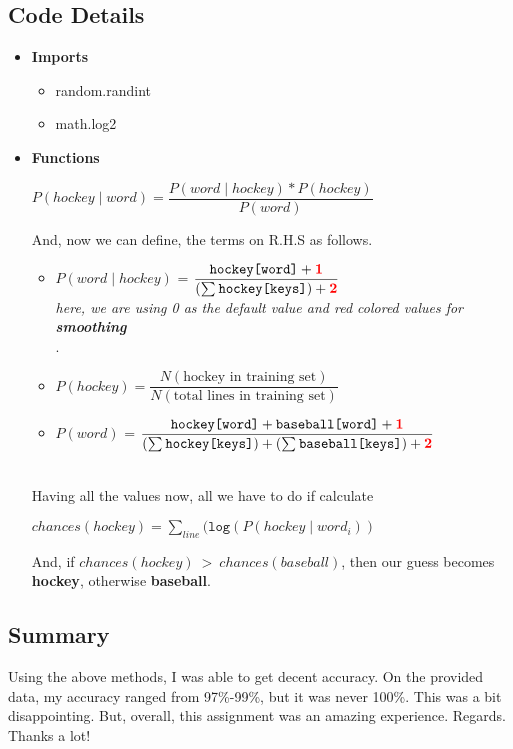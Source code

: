 \documentclass{article}
\begin{document}
    \pagebreak
    \subsection*{Code Details}
    
    \begin{itemize}
        \item \textbf{Imports}
            \begin{itemize}
                \item random.randint
                \item math.log2
            \end{itemize}
        \item \textbf{Functions}
        \begin{center}
                \begin{center}
                    \(P(hockey \mid word) = \dfrac{P(word \mid hockey)*P(hockey)}{P(word)}\)
                \end{center}
                And, now we can define, the terms on R.H.S as follows.
                \vspace{+5mm}
                \begin{itemize}
                    \item \(P(word\mid hockey)\) = \(\dfrac{\texttt{hockey[word]}+\textcolor{red}{\textbf{1}}}{(\sum_{}^{}\texttt{hockey[keys]})+\textcolor{red}{\textbf{2}}}\) \\[2mm]
                    {\scriptsize \emph{     here, we are using 0 as the default value and red colored values for \textbf{smoothing} \\}.}
                    \item \(P(hockey) = \dfrac{N(\text{hockey in training set})}{N(\text{total lines in training set})}\) \ \\[5mm] 
                    \item \(P(word)\) = \(\dfrac{\texttt{hockey[word]}+\texttt{baseball[word]}+\textcolor{red}{\textbf{1}}}{(\sum_{}^{}\texttt{hockey[keys]})+(\sum_{}^{}\texttt{baseball[keys]})+\textcolor{red}{\textbf{2}}}\)
                \end{itemize}
                \  \\[5mm]Having all the values now, all we have to do if calculate \\
                \begin{center}
                    \(chances(hockey) = \sum_{line}(\texttt{log}(P(hockey\mid word_i))\)
                \end{center}
                And, if \(chances(hockey)\ \mathcal{>} \  chances(baseball)\), then our guess becomes \textbf{hockey}, otherwise \textbf{baseball}.
        \end{center}
    \end{itemize}
    
    \subsection*{Summary}
    Using the above methods, I was able to get decent accuracy. On the provided data, my accuracy ranged from 97\%-99\%, but it was never 100\%. This was a bit disappointing. But, overall, this assignment was an amazing experience. Regards. Thanks a lot!
\end{document}
